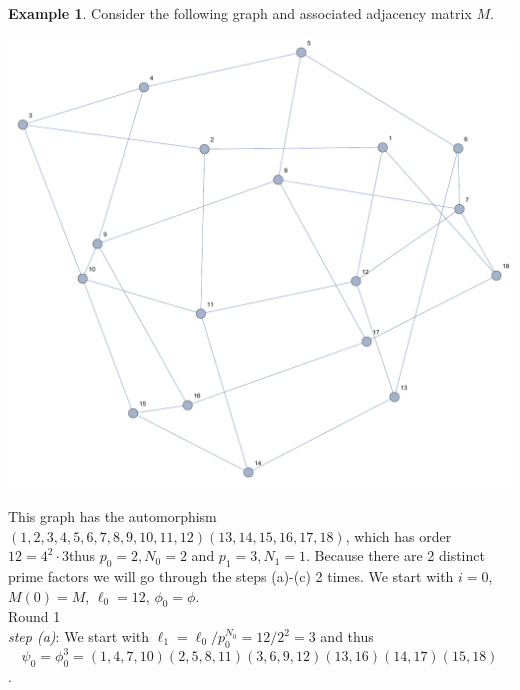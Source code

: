\documentclass[preprint,12pt]{elsarticle}
\theoremstyle{definition}
\newtheorem{example}[thm]{Example}
\theoremstyle{remark}
\renewcommand{\emph}{\textit}
\begin{document}
\begin{example}\label{ex:18}
Consider the following graph and associated adjacency matrix $M$.\\
\begin{center}
\includegraphics[scale=.5]{ex2_0.pdf}
\end{center}
This graph has the automorphism $(1,2,3,4,5,6,7,8,9,10,11,12)(13,14,15,16,17,18)$, which has order $12= 4^2 \cdot 3$thus $p_0=2,N_0=2$ and $p_1=3,N_1=1$.  Because there are 2 distinct prime factors we will go through the steps (a)-(c) 2 times. We start with $i=0$, $M(0)=M$, $\ell_0=12$, $\phi_0=\phi$.\\
\noindent Round 1\\
\emph{step (a)}:  We start with $\ell_1=\ell_0/p_0^{N_0}=12/2^2=3$ and thus $$\psi_0=\phi_0^3=(1,4,7,10)(2,5,8,11)(3,6,9,12)(13,16)(14,17)(15,18)$$.\\

\end{example}
\end{document}
